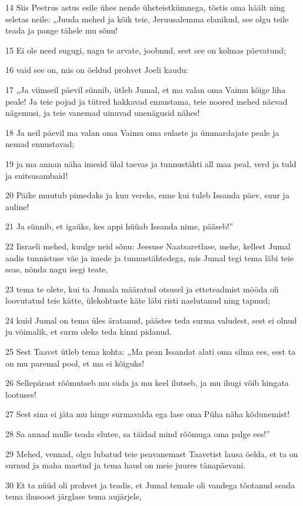 \par 14 Siis Peetrus astus esile ühes nende üheteistkümnega, tõstis oma häält ning seletas neile: „Juuda mehed ja kõik teie, Jeruusalemma elanikud, see olgu teile teada ja pange tähele mu sõnu!
\par 15 Ei ole need sugugi, nagu te arvate, joobnud, sest see on kolmas päevatund;
\par 16 vaid see on, mis on öeldud prohvet Joeli kaudu:
\par 17 „Ja viimseil päevil sünnib, ütleb Jumal, et ma valan oma Vaimu kõige liha peale! Ja teie pojad ja tütred hakkavad ennustama, teie noored mehed näevad nägemusi, ja teie vanemad uinuvad unenägusid nähes!
\par 18 Ja neil päevil ma valan oma Vaimu oma sulaste ja ümmardajate peale ja nemad ennustavad;
\par 19 ja ma annan näha imesid ülal taevas ja tunnustähti all maa peal, verd ja tuld ja suitsusambaid!
\par 20 Päike muutub pimedaks ja kuu vereks, enne kui tuleb Issanda päev, suur ja auline!
\par 21 Ja sünnib, et igaüks, kes appi hüüab Issanda nime, pääseb!”
\par 22 Iisraeli mehed, kuulge neid sõnu: Jeesuse Naatsaretlase, mehe, kellest Jumal andis tunnistuse väe ja imede ja tunnustähtedega, mis Jumal tegi tema läbi teie seas, nõnda nagu isegi teate,
\par 23 tema te olete, kui ta Jumala määratud otsusel ja etteteadmist mööda oli loovutatud teie kätte, ülekohtuste käte läbi risti naelutanud ning tapnud;
\par 24 kuid Jumal on tema üles äratanud, päästes teda surma valudest, sest ei olnud ju võimalik, et surm oleks teda kinni pidanud.
\par 25 Sest Taavet ütleb tema kohta: „Ma pean Issandat alati oma silma ees, sest ta on mu paremal pool, et ma ei kõiguks!
\par 26 Sellepärast rõõmutseb mu süda ja mu keel ilutseb, ja mu ihugi võib hingata lootuses!
\par 27 Sest sina ei jäta mu hinge surmavalda ega lase oma Püha näha kõdunemist!
\par 28 Sa annad mulle teada elutee, sa täidad mind rõõmuga oma palge ees!”
\par 29 Mehed, vennad, olgu lubatud teie peavanemast Taavetist lausa öelda, et ta on surnud ja maha maetud ja tema haud on meie juures tänapäevani.
\par 30 Et ta nüüd oli prohvet ja teadis, et Jumal temale oli vandega tõotanud seada tema ihusoost järglase tema aujärjele,
